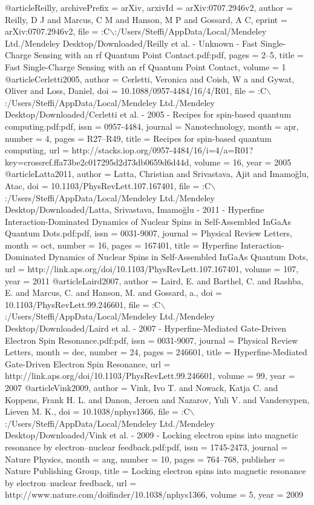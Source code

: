 @article{Reilly,
archivePrefix = {arXiv},
arxivId = {arXiv:0707.2946v2},
author = {Reilly, D J and Marcus, C M and Hanson, M P and Gossard, A C},
eprint = {arXiv:0707.2946v2},
file = {:C$\backslash$:/Users/Steffi/AppData/Local/Mendeley Ltd./Mendeley Desktop/Downloaded/Reilly et al. - Unknown - Fast Single-Charge Sensing with an rf Quantum Point Contact.pdf:pdf},
pages = {2--5},
title = {{Fast Single-Charge Sensing with an rf Quantum Point Contact}},
volume = {1}
}
@article{Cerletti2005,
author = {Cerletti, Veronica and Coish, W a and Gywat, Oliver and Loss, Daniel},
doi = {10.1088/0957-4484/16/4/R01},
file = {:C$\backslash$:/Users/Steffi/AppData/Local/Mendeley Ltd./Mendeley Desktop/Downloaded/Cerletti et al. - 2005 - Recipes for spin-based quantum computing.pdf:pdf},
issn = {0957-4484},
journal = {Nanotechnology},
month = {apr},
number = {4},
pages = {R27--R49},
title = {{Recipes for spin-based quantum computing}},
url = {http://stacks.iop.org/0957-4484/16/i=4/a=R01?key=crossref.ffa73be2c017295d2d73db0659d6d44d},
volume = {16},
year = {2005}
}
@article{Latta2011,
author = {Latta, Christian and Srivastava, Ajit and Imamoğlu, Atac},
doi = {10.1103/PhysRevLett.107.167401},
file = {:C$\backslash$:/Users/Steffi/AppData/Local/Mendeley Ltd./Mendeley Desktop/Downloaded/Latta, Srivastava, Imamoğlu - 2011 - Hyperfine Interaction-Dominated Dynamics of Nuclear Spins in Self-Assembled InGaAs Quantum Dots.pdf:pdf},
issn = {0031-9007},
journal = {Physical Review Letters},
month = {oct},
number = {16},
pages = {167401},
title = {{Hyperfine Interaction-Dominated Dynamics of Nuclear Spins in Self-Assembled InGaAs Quantum Dots}},
url = {http://link.aps.org/doi/10.1103/PhysRevLett.107.167401},
volume = {107},
year = {2011}
}
@article{Laird2007,
author = {Laird, E. and Barthel, C. and Rashba, E. and Marcus, C. and Hanson, M. and Gossard, a.},
doi = {10.1103/PhysRevLett.99.246601},
file = {:C$\backslash$:/Users/Steffi/AppData/Local/Mendeley Ltd./Mendeley Desktop/Downloaded/Laird et al. - 2007 - Hyperfine-Mediated Gate-Driven Electron Spin Resonance.pdf:pdf},
issn = {0031-9007},
journal = {Physical Review Letters},
month = {dec},
number = {24},
pages = {246601},
title = {{Hyperfine-Mediated Gate-Driven Electron Spin Resonance}},
url = {http://link.aps.org/doi/10.1103/PhysRevLett.99.246601},
volume = {99},
year = {2007}
}
@article{Vink2009,
author = {Vink, Ivo T. and Nowack, Katja C. and Koppens, Frank H. L. and Danon, Jeroen and Nazarov, Yuli V. and Vandersypen, Lieven M. K.},
doi = {10.1038/nphys1366},
file = {:C$\backslash$:/Users/Steffi/AppData/Local/Mendeley Ltd./Mendeley Desktop/Downloaded/Vink et al. - 2009 - Locking electron spins into magnetic resonance by electron–nuclear feedback.pdf:pdf},
issn = {1745-2473},
journal = {Nature Physics},
month = {aug},
number = {10},
pages = {764--768},
publisher = {Nature Publishing Group},
title = {{Locking electron spins into magnetic resonance by electron–nuclear feedback}},
url = {http://www.nature.com/doifinder/10.1038/nphys1366},
volume = {5},
year = {2009}
}
